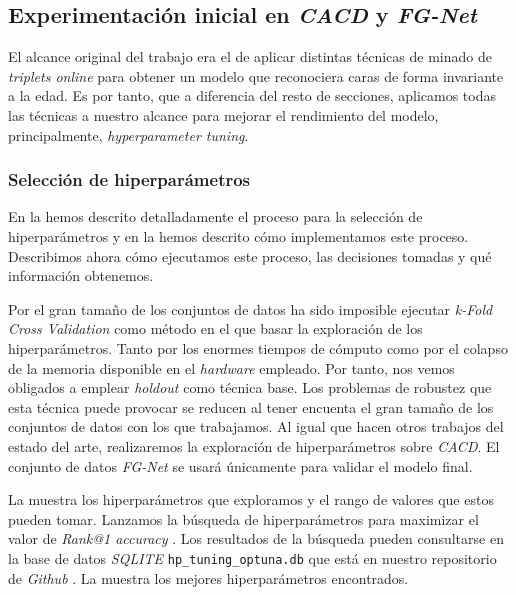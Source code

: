 \subsection{Experimentación inicial en \textit{CACD} y \textit{FG-Net}} \label{isubsec:experimentacion_inicial}

El alcance original del trabajo era el de aplicar distintas técnicas de minado de \textit{triplets online} para obtener un modelo que reconociera caras de forma invariante a la edad. Es por tanto, que a diferencia del resto de secciones, aplicamos todas las técnicas a nuestro alcance para mejorar el rendimiento del modelo, principalmente, \textit{hyperparameter tuning}.

\subsubsection{Selección de hiperparámetros} \label{isec:experimentacion_hp_tuning}

En la  hemos descrito detalladamente el proceso para la selección de hiperparámetros y en la  hemos descrito cómo implementamos este proceso. Describimos ahora cómo ejecutamos este proceso, las decisiones tomadas y qué información obtenemos.

Por el gran tamaño de los conjuntos de datos ha sido imposible ejecutar \textit{k-Fold Cross Validation} como método en el que basar la exploración de los hiperparámetros. Tanto por los enormes tiempos de cómputo como por el colapso de la memoria disponible en el \textit{hardware} empleado. Por tanto, nos vemos obligados a emplear \textit{holdout} como técnica base. Los problemas de robustez que esta técnica puede provocar se reducen al tener encuenta el gran tamaño de los conjuntos de datos con los que trabajamos. Al igual que hacen otros trabajos del estado del arte, realizaremos la exploración de hiperparámetros sobre \textit{CACD}. El conjunto de datos \textit{FG-Net} se usará únicamente para validar el modelo final.

La  muestra los hiperparámetros que exploramos y el rango de valores que estos pueden tomar. Lanzamos la búsqueda de hiperparámetros para maximizar el valor de \textit{Rank@1 accuracy} \footnotemark. Los resultados de la búsqueda pueden consultarse en la base de datos \textit{SQLITE} \lstinline{hp_tuning_optuna.db} que está en nuestro repositorio de \textit{Github} \footnotemark. La  muestra los mejores hiperparámetros encontrados.

